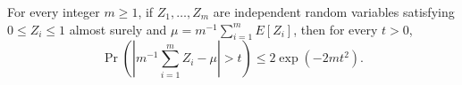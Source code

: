 For every integer \(m\ge1\), if \(Z_1,\ldots,Z_m\) are independent random variables satisfying \(0\le Z_i\le1\) almost surely and \(\mu=m^{-1}\sum_{i=1}^m E[Z_i]\), then for every \(t>0\),
\[
 \Pr\left(\left|m^{-1}\sum_{i=1}^m Z_i-\mu\right|>t\right)\le2\exp(-2mt^2).
\]